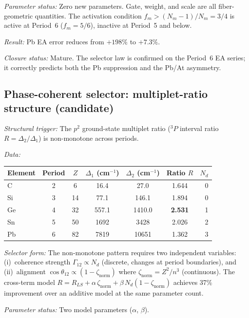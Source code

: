 \documentclass[11pt,a4paper]{article}
\begin{document}
\emph{Parameter status:} Zero new parameters. Gate, weight, and scale are all fiber-geometric quantities. The activation condition $f_m > (N_m - 1)/N_m = 3/4$ is active at Period~6 ($f_m = 5/6$), inactive at Period~5 and below.

\emph{Result:} Pb EA error reduces from $+198\%$ to $+7.3\%$.

\emph{Closure status:} Mature. The selector law is confirmed on the Period~6 EA series; it correctly predicts both the Pb suppression and the Pb/At asymmetry.

\subsection{Phase-coherent selector: multiplet-ratio structure (candidate)}
\label{sec:stage3d}

\emph{Structural trigger:} The $p^2$ ground-state multiplet ratio (${}^3P$ interval ratio $R = \Delta_2/\Delta_1$) is non-monotone across periods.

\emph{Data:}
\begin{center}
\renewcommand{\arraystretch}{1.15}
\begin{tabular}{lcccccr}
\toprule
Element & Period & $Z$ & $\Delta_1$ (cm$^{-1}$) & $\Delta_2$ (cm$^{-1}$) & Ratio $R$ & $N_d$ \\
\midrule
C  & 2 &  6 &  16.4 &    27.0 & 1.644 & 0 \\
Si & 3 & 14 &  77.1 &   146.1 & 1.894 & 0 \\
Ge & 4 & 32 & 557.1 &  1410.0 & \textbf{2.531} & 1 \\
Sn & 5 & 50 & 1692  &  3428   & 2.026 & 2 \\
Pb & 6 & 82 & 7819  & 10651   & 1.362 & 3 \\
\bottomrule
\end{tabular}
\end{center}

\emph{Selector form:} The non-monotone pattern requires two independent variables: (i)~coherence strength $\Gamma_{12} \propto N_d$ (discrete, changes at period boundaries), and (ii)~alignment $\cos\theta_{12} \propto (1 - \zeta_{\mathrm{norm}})$ where $\zeta_{\mathrm{norm}} = Z^2/n^3$ (continuous). The cross-term model $R = R_{LS} + \alpha\,\zeta_{\mathrm{norm}} + \beta\, N_d(1 - \zeta_{\mathrm{norm}})$ achieves 37\% improvement over an additive model at the same parameter count.

\emph{Parameter status:} Two model parameters ($\alpha$, $\beta$).
\end{document}
